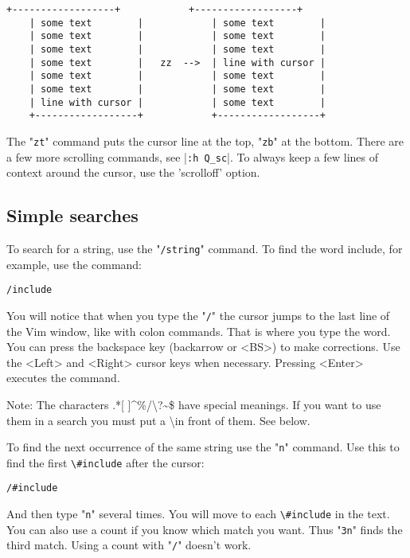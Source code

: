 \begin{Verbatim}[samepage=true]
    +------------------+            +------------------+
    | some text        |            | some text        |
    | some text        |            | some text        |
    | some text        |            | some text        |
    | some text        |   zz  -->  | line with cursor |
    | some text        |            | some text        |
    | some text        |            | some text        |
    | line with cursor |            | some text        |
    +------------------+            +------------------+
\end{Verbatim}

The "\verb!zt!" command puts the cursor line at the top, "\verb!zb!" at the bottom.
There are a few more scrolling commands, see |\verb!:h Q_sc!|.
To always keep a few lines of context around the cursor, use the 'scrolloff' option.

\subsection{Simple searches}

To search for a string, use the "\verb!/string!" command.
To find the word include, for example, use the command:

 \begin{Verbatim}[samepage=true]
 /include
 \end{Verbatim}

You will notice that when you type the "\verb!/!" the cursor jumps to the last line of the Vim window, like with colon commands.
That is where you type the word.
You can press the backspace key (backarrow or <BS>) to make corrections.
Use the <Left> and <Right> cursor keys when necessary.
Pressing <Enter> executes the command.

Note:
The characters .*[ ]\textasciicircum\%/\textbackslash?\textasciitilde\$ have special meanings.
If you want to use them in a search you must put a \textbackslash in front of them.
See below.

To find the next occurrence of the same string use the "\verb!n!" command.
Use this to find the first \verb!\#include! after the cursor:%

 \begin{Verbatim}[samepage=true]
 /#include
 \end{Verbatim}

And then type "\verb!n!" several times.
You will move to each \verb!\#include! in the text.
You can also use a count if you know which match you want.
Thus "\verb!3n!" finds the third match.
Using a count with "\verb!/!" doesn't work.


